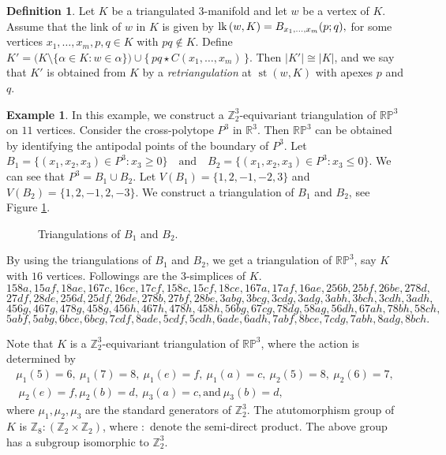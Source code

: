 \documentclass[11pt]{amsart}
\numberwithin{equation}{section}
\theoremstyle{definition}
\newtheorem{defn}[theorem]{Definition}
\newtheorem{example}[theorem]{Example}
\newcommand{\lk}{\mbox{\upshape lk}\,}
\def \bb{\mathbb}
\def \RR{{\bb{R}}}
\def \ZZ{{\bb{Z}}}
\begin{document}
\begin{defn}\label{defn}
Let $K$ be a triangulated $3$-manifold and let $w$ be a vertex of $K$. 
Assume that the link of $w$ in $K$ is given by
$\lk(w,K)=B_{x_1,\dots,x_m}(p;q),$
for some vertices $x_1,\dots,x_m,p,q\in K$ with $pq\notin K$. Define $K' = \bigl(K \setminus \{\alpha \in K : w \in \alpha\}\bigr) \cup \{\, pq \star C(x_1,\dots,x_m) \,\}.$
Then $|K'|\cong |K|$, and we say that $K'$ is obtained from $K$ by a \emph{retriangulation} at $\operatorname{st}(w,K)$ with apexes $p$ and $q$.
\end{defn}     
  



\begin{example}\label{rp3e}
In this example, we construct a $\ZZ_2^3$-equivariant triangulation of $\mathbb{RP}^3$  on $11$ vertices. 
Consider the cross-polytope $P^3$ in $\RR^3$. Then $\mathbb{RP}^3$
can be obtained by identifying the antipodal points of the boundary of $P^3$. Let  $B_1 = \{(x_1, x_2, x_3) \in P^3 : x_3 \geq 0\} \quad
 \mbox{and} \quad B_2 = \{(x_1, x_2, x_3) \in P^3 : x_3 \leq 0\}$. We can see that $P^3=B_1\cup B_2$.  Let $V(B_1)=\{1, 2, -1, -2, 3\}$ and $V(B_2)=\{1, 2, -1, 2, -3\}$. We construct a triangulation of $B_1$ and $B_2$, see Figure \ref{rpn203}.
\begin{figure}[ht]
\centerline{
\scalebox{.60}{

 }
 }
\caption {Triangulations of $B_1$ and $B_2$. }
\label{rpn203}
\end{figure}
By using the triangulations of $B_1$ and $B_2$, we get a triangulation of $\mathbb{RP}^3$, say $K$ with $16$ vertices. Followings are the $3$-simplices of $K$.
\noindent$$158a, 15af, 18ae, 167c, 16ce, 17cf, 158c, 15cf, 18ce, 167a, 17af, 16ae,
256b, 25bf, 26be, 278d,$$ 
$$27df, 28de, 256d, 25df, 26de, 278b, 27bf, 28be, 3abg, 3bcg, 3cdg, 3adg, 3abh, 3bch, 3cdh, 3adh,$$
$$456g, 467g, 478g, 458g,
 456h, 467h, 478h, 458h, 56bg, 67cg, 78dg, 58ag, 56dh, 67ah, 78bh, 58ch,$$ 
 $$ 5abf, 5abg, 6bce, 6bcg, 7cdf, 8ade, 5cdf, 5cdh, 6ade, 6adh, 7abf, 8bce,
 7cdg, 7abh, 8adg, 8bch.$$


Note that $K$ is a $\ZZ_2^3$-equivariant triangulation of $\mathbb{RP}^3$, where the action is determined by 
\begin{equation}\label{rp31}
\begin{array}{ll} \mu_1(5)=6,~ \mu_1(7)=8, ~\mu_1(e)=f, ~ \mu_1(a)=c, ~\mu_2(5)=8, ~\mu_2(6)=7,\\
 ~\mu_2(e)=f, \mu_2(b)=d, ~ \mu_3(a)=c, \text{and} ~\mu_3(b)=d,
\end{array}
\end{equation}
where $\mu_1, \mu_2, \mu_3$ are the standard generators of $\ZZ_2^3$. The atutomorphism group of $K$ is $\ZZ_8 : (\ZZ_2 \times \ZZ_2)$, where $:$ denote the semi-direct product. The above group has a subgroup isomorphic to $\ZZ_2^3$.


\end{example}
\end{document}
